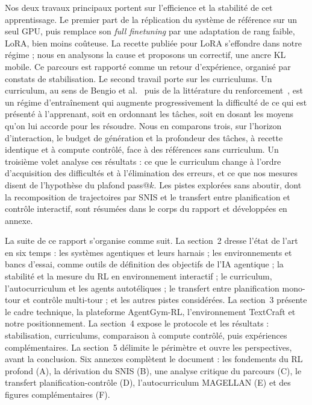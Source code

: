 \documentclass[11pt,a4paper]{article}
\begin{document}
Nos deux travaux principaux portent sur l'efficience et la stabilité de cet apprentissage. Le premier part de la réplication du système de référence sur un seul GPU, puis remplace son \emph{full finetuning} par une adaptation de rang faible, LoRA, bien moins coûteuse. La recette publiée pour LoRA s'effondre dans notre régime ; nous en analysons la cause et proposons un correctif, une ancre KL mobile. Ce parcours est rapporté comme un retour d'expérience, organisé par constats de stabilisation. Le second travail porte sur les curriculums. Un curriculum, au sens de Bengio et al.~\cite{bengio2009curriculum} puis de la littérature du renforcement~\cite{narvekar2020curriculum}, est un régime d'entraînement qui augmente progressivement la difficulté de ce qui est présenté à l'apprenant, soit en ordonnant les tâches, soit en dosant les moyens qu'on lui accorde pour les résoudre. Nous en comparons trois, sur l'horizon d'interaction, le budget de génération et la profondeur des tâches, à recette identique et à compute contrôlé, face à des références sans curriculum. Un troisième volet analyse ces résultats : ce que le curriculum change à l'ordre d'acquisition des difficultés et à l'élimination des erreurs, et ce que nos mesures disent de l'hypothèse du plafond pass@$k$. Les pistes explorées sans aboutir, dont la recomposition de trajectoires par SNIS et le transfert entre planification et contrôle interactif, sont résumées dans le corps du rapport et développées en annexe.

La suite de ce rapport s'organise comme suit. La section~2 dresse l'état de l'art en six temps : les systèmes agentiques et leurs harnais ; les environnements et bancs d'essai, comme outils de définition des objectifs de l'IA agentique ; la stabilité et la mesure du RL en environnement interactif ; le curriculum, l'autocurriculum et les agents autotéliques ; le transfert entre planification mono-tour et contrôle multi-tour ; et les autres pistes considérées. La section~3 présente le cadre technique, la plateforme AgentGym-RL, l'environnement TextCraft et notre positionnement. La section~4 expose le protocole et les résultats : stabilisation, curriculums, comparaison à compute contrôlé, puis expériences complémentaires. La section~5 délimite le périmètre et ouvre les perspectives, avant la conclusion. Six annexes complètent le document : les fondements du RL profond (A), la dérivation du SNIS (B), une analyse critique du parcours (C), le transfert planification-contrôle (D), l'autocurriculum MAGELLAN (E) et des figures complémentaires (F). 
\end{document}

